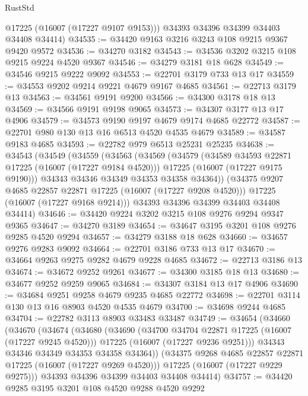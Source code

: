 \begin{lexlean}{RustStd}
\begin{coremodule}
        @17225
        (@16007 (@17227 @9107 @9153)))
      @34393
      @34396
      @34399
      @34403
      @34408
      @34414)
@34535 := @34420 @9163 @3216 @3243 @108 @9215 @9367 @9420 @9572
@34536 := @34270 @3182
@34543 := @34536 @3202 @3215 @108 @9215 @9224 @4520 @9367
@34546 := @34279 @3181 @18 @628
@34549 := @34546 @9215 @9222 @9092
@34553 := @22701 @3179 @733 @13 @17
@34559 := @34553 @9202 @9214 @9221 @4679 @9167 @4685
@34561 := @22713 @3179 @13
@34563 := @34561 @9191 @9200
@34566 := @34300 @3178 @18 @13
@34569 := @34566 @9191 @9198 @9065
@34573 := @34307 @3177 @13 @17 @4906
@34579 := @34573 @9190 @9197 @4679 @9174 @4685 @22772
@34587 := @22701 @980 @130 @13 @16 @6513 @4520 @4535 @4679
@34589 := @34587 @9183 @4685
@34593 := @22782 @979 @6513 @25231 @25235
@34638 := @34543
    (@34549
      (@34559
        (@34563
          (@34569
            (@34579
              (@34589 @34593 @22871 @17225 (@16007 (@17227 @9184 @4520)))
              @17225
              (@16007 (@17227 @9175 @9190)))
            @34343
            @34346
            @34349
            @34353
            @34358
            @34364))
        (@34375 @9207 @4685 @22857 @22871 @17225 (@16007 (@17227 @9208 @4520)))
        @17225
        (@16007 (@17227 @9168 @9214)))
      @34393
      @34396
      @34399
      @34403
      @34408
      @34414)
@34646 := @34420 @9224 @3202 @3215 @108 @9276 @9294 @9347 @9365
@34647 := @34270 @3189
@34654 := @34647 @3195 @3201 @108 @9276 @9285 @4520 @9294
@34657 := @34279 @3188 @18 @628
@34660 := @34657 @9276 @9283 @9092
@34664 := @22701 @3186 @733 @13 @17
@34670 := @34664 @9263 @9275 @9282 @4679 @9228 @4685
@34672 := @22713 @3186 @13
@34674 := @34672 @9252 @9261
@34677 := @34300 @3185 @18 @13
@34680 := @34677 @9252 @9259 @9065
@34684 := @34307 @3184 @13 @17 @4906
@34690 := @34684 @9251 @9258 @4679 @9235 @4685 @22772
@34698 := @22701 @3114 @130 @13 @16 @8903 @4520 @4535 @4679
@34700 := @34698 @9244 @4685
@34704 := @22782 @3113 @8903 @33483 @33487
@34749 := @34654
    (@34660
      (@34670
        (@34674
          (@34680
            (@34690
              (@34700 @34704 @22871 @17225 (@16007 (@17227 @9245 @4520)))
              @17225
              (@16007 (@17227 @9236 @9251)))
            @34343
            @34346
            @34349
            @34353
            @34358
            @34364))
        (@34375 @9268 @4685 @22857 @22871 @17225 (@16007 (@17227 @9269 @4520)))
        @17225
        (@16007 (@17227 @9229 @9275)))
      @34393
      @34396
      @34399
      @34403
      @34408
      @34414)
@34757 := @34420 @9285 @3195 @3201 @108 @4520 @9288 @4520 @9292

\end{coremodule}
\end{lexlean}
